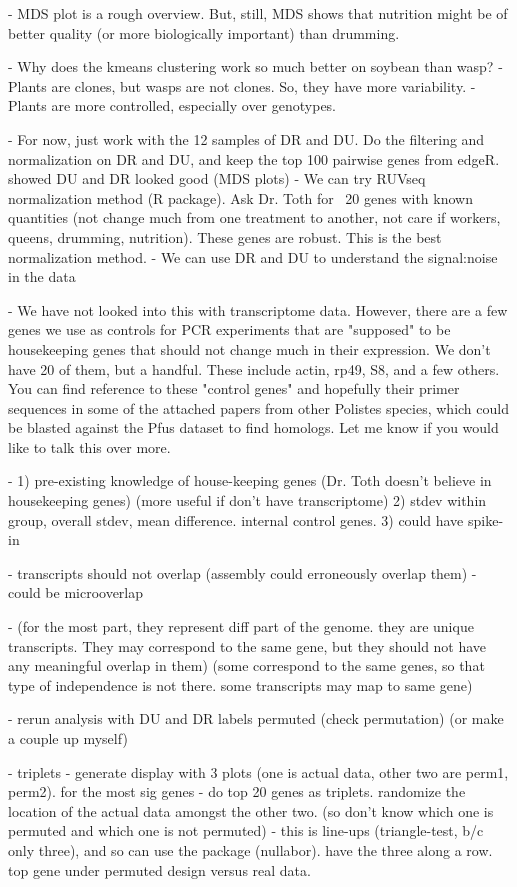 \documentclass[11pt,a4paper,oldfontcommands,openany]{memoir}
\numberwithin{equation}{section} %
\begin{document}
- MDS plot is a rough overview. But, still, MDS shows that nutrition might be of better quality (or more biologically important) than drumming.

- Why does the kmeans clustering work so much better on soybean than wasp?
	- Plants are clones, but wasps are not clones. So, they have more variability.
	- Plants are more controlled, especially over genotypes.

- For now, just work with the 12 samples of DR and DU. Do the filtering and normalization on DR and DU, and keep the top 100 pairwise genes from edgeR.
showed DU and DR looked good (MDS plots)
- We can try RUVseq normalization method (R package). Ask Dr. Toth for ~20 genes with known quantities (not change much from one treatment to another, not care if workers, queens, drumming, nutrition). These genes are robust. This is the best normalization method.
- We can use DR and DU to understand the signal:noise in the data

- We have not looked into this with transcriptome data. However, there are a few genes we use as controls for PCR experiments that are "supposed" to be housekeeping genes that should not change much in their expression. We don't have 20 of them, but a handful. These include actin, rp49, S8, and a few others. You can find reference to these "control genes" and hopefully their primer sequences in some of the attached papers from other Polistes species, which could be blasted against the Pfus dataset to find homologs. Let me know if you would like to talk this over more.

- 1) pre-existing knowledge of house-keeping genes (Dr. Toth doesn’t believe in housekeeping genes) (more useful if don’t have transcriptome)
2) stdev within group, overall stdev, mean difference. internal control genes.
3) could have spike-in



- transcripts should not overlap (assembly could erroneously overlap them)
- could be microoverlap 

- (for the most part, they represent diff part of the genome. they are unique transcripts. They may correspond to the same gene, but they should not have any meaningful overlap in them) (some correspond to the same genes, so that type of independence is not there. some transcripts may map to same gene)

- rerun analysis with DU and DR labels permuted (check permutation) (or make a couple up myself)


- triplets - generate display with 3 plots (one is actual data, other two are perm1, perm2). for the most sig genes
- do top 20 genes as triplets. randomize the location of the actual data amongst the other two. (so don’t know which one is permuted and which one is not permuted)
- this is line-ups (triangle-test, b/c only three), and so can use the package (nullabor). have the three along a row. top gene under permuted design versus real data.
\end{document}
